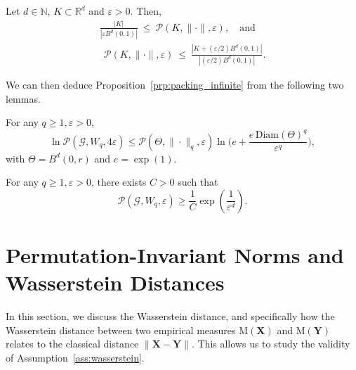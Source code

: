 \begin{lemma}\label{lem:Vershynin}
Let $d\in\mathbb N$, \( K \subset \mathbb{R}^d \) and \( \varepsilon > 0 \). Then,
\begin{align*}
    \frac{|K|}{|\varepsilon B^d(0,1)|} 
\ \leq\ \mathcal{P}(K, \|\cdot\|, \varepsilon),\quad\mbox{and}\\ 
\ \ \mathcal{P}(K, \|\cdot\|, \varepsilon) 
\ \leq\ \frac{|K + (\varepsilon/2)B^d(0,1)|}{|(\varepsilon/2) B^d(0,1)|}.
\end{align*}
\end{lemma}

We can then deduce Proposition~\ref{prp:packing_infinite} from the following two lemmas.

\begin{lemma}
    For any $q\ge1,\varepsilon>0$,
    \[\operatorname{ln} \mathcal P(\mathcal{G}, W_q,4\varepsilon) \leq \mathcal P(\Theta, \|\cdot\|_q, \varepsilon) \operatorname{ln}\Big(e + \frac{e \, \mathrm{Diam}(\Theta)^q}{\varepsilon^q}\Big),\]
    with $\Theta=B^d(0,r)$ and $e=\exp(1)$.
\end{lemma}


\begin{lemma}\label{prp:klo}
   For any $q\ge1,\varepsilon>0$, there exists $C>0$ such that
    \[
    \mathcal{P}(\mathcal G, W_q,\varepsilon)\ge\frac1C\exp(\frac1{\varepsilon^d}).
    \]
\end{lemma}

\section{Permutation-Invariant Norms and Wasserstein Distances}\label{app:wasserstein}

In this section, we discuss the Wasserstein distance, and specifically how the Wasserstein distance between two empirical measures $\mathrm M(\mathbf X)$ and $\mathrm M(\mathbf Y)$ relates to the classical distance $\|\mathbf X-\mathbf Y\|$. This allows us to study the validity of Assumption~\ref{ass:wasserstein}.


